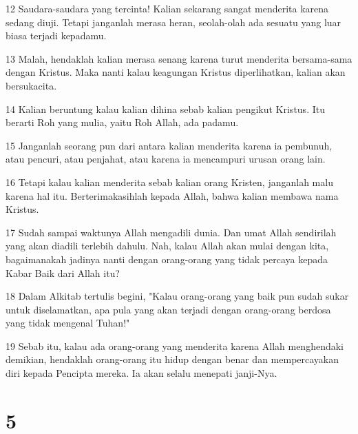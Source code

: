 \par 12 Saudara-saudara yang tercinta! Kalian sekarang sangat menderita karena sedang diuji. Tetapi janganlah merasa heran, seolah-olah ada sesuatu yang luar biasa terjadi kepadamu.
\par 13 Malah, hendaklah kalian merasa senang karena turut menderita bersama-sama dengan Kristus. Maka nanti kalau keagungan Kristus diperlihatkan, kalian akan bersukacita.
\par 14 Kalian beruntung kalau kalian dihina sebab kalian pengikut Kristus. Itu berarti Roh yang mulia, yaitu Roh Allah, ada padamu.
\par 15 Janganlah seorang pun dari antara kalian menderita karena ia pembunuh, atau pencuri, atau penjahat, atau karena ia mencampuri urusan orang lain.
\par 16 Tetapi kalau kalian menderita sebab kalian orang Kristen, janganlah malu karena hal itu. Berterimakasihlah kepada Allah, bahwa kalian membawa nama Kristus.
\par 17 Sudah sampai waktunya Allah mengadili dunia. Dan umat Allah sendirilah yang akan diadili terlebih dahulu. Nah, kalau Allah akan mulai dengan kita, bagaimanakah jadinya nanti dengan orang-orang yang tidak percaya kepada Kabar Baik dari Allah itu?
\par 18 Dalam Alkitab tertulis begini, "Kalau orang-orang yang baik pun sudah sukar untuk diselamatkan, apa pula yang akan terjadi dengan orang-orang berdosa yang tidak mengenal Tuhan!"
\par 19 Sebab itu, kalau ada orang-orang yang menderita karena Allah menghendaki demikian, hendaklah orang-orang itu hidup dengan benar dan mempercayakan diri kepada Pencipta mereka. Ia akan selalu menepati janji-Nya.

\chapter{5}

